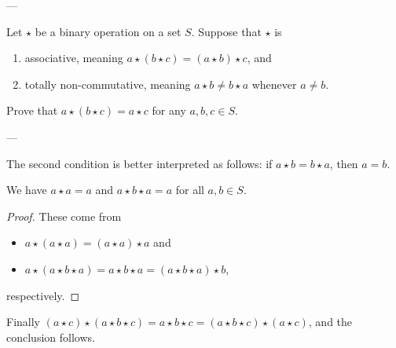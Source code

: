 
---

Let $\star$ be a binary operation on a set $S$. Suppose that $\star$ is
\begin{enumerate}[label=(\roman*),itemsep=0em]
    \item associative, meaning $a\star(b\star c)=(a\star b)\star c$, and
    \item totally non-commutative, meaning $a\star b\ne b\star a$ whenever $a\ne b$.
\end{enumerate}
Prove that $a\star(b\star c)=a\star c$ for any $a,b,c\in S$.

---

The second condition is better interpreted as follows: if $a\star b=b\star a$, then $a=b$.
\begin{iclaim*}
    We have $a\star a=a$ and $a\star b\star a=a$ for all $a,b\in S$.
\end{iclaim*}
\begin{proof}
    These come from
    \begin{itemize}[itemsep=0em]
        \item $a\star(a\star a)=(a\star a)\star a$ and
        \item $a\star(a\star b\star a)=a\star b\star a=(a\star b\star a)\star b$,
    \end{itemize}
    respectively.
\end{proof}

Finally $(a\star c)\star(a\star b\star c)=a\star b\star c=(a\star b\star c)\star(a\star c)$, and the conclusion follows.

